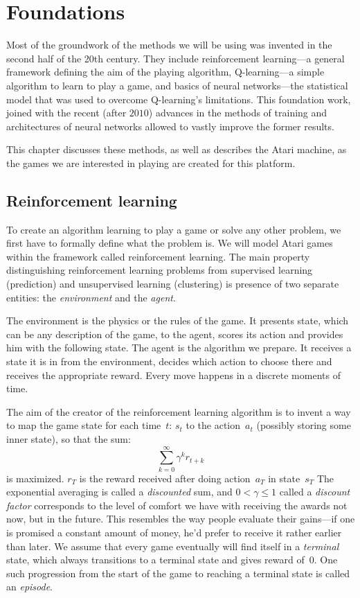 \chapter{Foundations}\label{foundations}
Most of the groundwork of the methods we will be using was invented in the second half of the 20th century. They include reinforcement learning---a general framework defining the aim of the playing algorithm, Q-learning---a simple algorithm to learn to play a game, and basics of neural networks---the statistical model that was used to overcome Q-learning's limitations.
This foundation work, joined with the recent (after $2010$) advances in the methods of training and architectures of neural networks allowed to vastly improve the former results.

This chapter discusses these methods, as well as describes the Atari machine, as the games we are interested in playing are created for this platform.

\section{Reinforcement learning}
To create an algorithm learning to play a game or solve any other problem, we first have to formally define what the problem is. We will model Atari games within the framework called reinforcement learning. The main property distinguishing reinforcement learning problems from supervised learning (prediction) and unsupervised learning (clustering) is presence of two separate entities: the \emph{environment} and the \emph{agent}.

The environment is the physics or the rules of the game. It presents state, which can be any description of the game, to the agent, scores its action and provides him with the following state.
The agent is the algorithm we prepare. It receives a state it is in from the environment, decides which action to choose there and receives the appropriate reward. Every move happens in a discrete moments of time.

The aim of the creator of the reinforcement learning algorithm is to invent a way to map the game state for each time~$t$: $s_t$ to the action~$a_t$ (possibly storing some inner state), so that the sum:
\begin{equation} \label{discounted-reward}
\sum_{k=0}^{\infty} \gamma^k r_{t + k}
\end{equation}
is maximized. $r_T$ is the reward received after doing action~$a_T$ in state~$s_T$ The exponential averaging is called a \emph{discounted} sum, and $0 < \gamma \le 1$ called a \emph{discount factor} corresponds to the level of comfort we have with receiving the awards not now, but in the future. This resembles the way people evaluate their gains---if one is promised a constant amount of money, he'd prefer to receive it rather earlier than later. We assume that every game eventually will find itself in a \emph{terminal} state, which always transitions to a terminal state and gives reward of~$0$. One such progression from the start of the game to reaching a terminal state is called an \emph{episode}.

